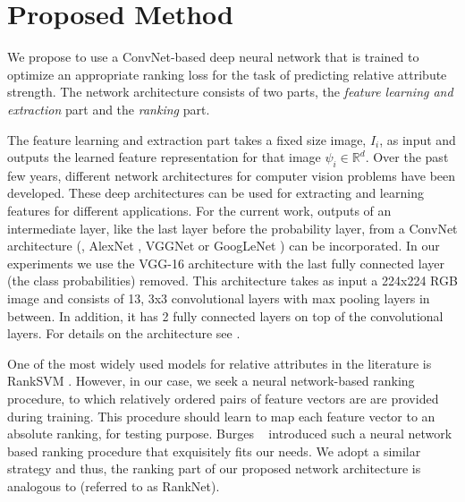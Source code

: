 \section{Proposed Method}
\label{sec.3}

We propose to use a ConvNet-based deep neural network that is trained to optimize an appropriate ranking loss for the task of predicting relative attribute strength. The network architecture consists of two parts, the \textit{feature learning and extraction} part and the \textit{ranking} part.

The feature learning and extraction part takes a fixed size image, $I_i$, as input and outputs the learned feature representation for that image $\psi_i \in \mathbb{R}^d$.
Over the past few years, different network architectures for computer vision problems have been developed. These deep architectures can be used for extracting and learning features for different applications.
For the current work, outputs of an intermediate layer, like the last layer before the probability layer, from a ConvNet architecture (\eg, AlexNet \cite{Krizhevsky2012ImageNetCW}, VGGNet \cite{verydeep} or GoogLeNet \cite{googlenet}) can be incorporated. %
In our experiments we use the VGG-16 architecture \cite{verydeep} with the last fully connected layer (the class probabilities) removed. This architecture takes as input a 224x224 RGB image and consists of 13, 3x3 convolutional layers with max pooling layers in between. In addition, it has 2 fully connected layers on top of the convolutional layers. For details on the architecture see \cite{verydeep}.

One of the most widely used models for relative attributes in the literature is RankSVM \cite{Joachims2002}. However,
in our case, we seek a neural network-based ranking procedure, to which relatively ordered pairs of feature vectors are are provided during training. This procedure should learn to map each feature vector to an absolute ranking, for testing purpose. Burges \etal~\cite{Burges2005} introduced such a neural network based ranking procedure that exquisitely fits our needs. %
We adopt a similar strategy and thus, the ranking part of our proposed network architecture is analogous to \cite{Burges2005} (referred to as RankNet).

